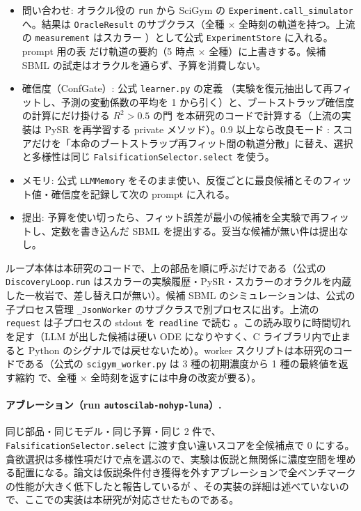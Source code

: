 \documentclass{article}
\begin{document}
\begin{itemize}
\item 問い合わせ: オラクル役の \texttt{run} から SciGym の \texttt{Experiment.call\_simulator} へ。結果は \texttt{OracleResult} のサブクラス（全種 × 全時刻の軌道を持つ。上流の \texttt{measurement} はスカラー \cite[s2.p34]{kabra-2026-llm}）として公式 \texttt{ExperimentStore} に入れる。prompt 用の表 \cite[s2.p33]{kabra-2026-llm} だけ軌道の要約（5 時点 × 全種）に上書きする。候補 SBML の試走はオラクルを通らず、予算を消費しない。
\item 確信度（ConfGate）: 公式 \texttt{learner.py} の定義 \cite[s2.p35]{kabra-2026-llm}（実験を復元抽出して再フィットし、予測の変動係数の平均を 1 から引く）と、ブートストラップ確信度の計算にだけ掛ける $R^2 > 0.5$ の門 \cite[s2.p36]{kabra-2026-llm} を本研究のコードで計算する（上流の実装は PySR を再学習する private メソッド）。0.9 以上なら改良モード \cite[s2.p12]{kabra-2026-llm}: スコアだけを「本命のブートストラップ再フィット間の軌道分散」に替え、選択と多様性は同じ \texttt{FalsificationSelector.select} を使う。
\item メモリ: 公式 \texttt{LLMMemory} をそのまま使い、反復ごとに最良候補とそのフィット値・確信度を記録して次の prompt に入れる。
\item 提出: 予算を使い切ったら、フィット誤差が最小の候補を全実験で再フィットし、定数を書き込んだ SBML を提出する。妥当な候補が無い件は提出なし。
\end{itemize}
ループ本体は本研究のコードで、上の部品を順に呼ぶだけである（公式の \texttt{DiscoveryLoop.run} はスカラーの実験履歴・PySR・スカラーのオラクルを内蔵した一枚岩で、差し替え口が無い）。候補 SBML のシミュレーションは、公式の子プロセス管理 \texttt{\_JsonWorker} のサブクラスで別プロセスに出す。上流の \texttt{request} は子プロセスの stdout を \texttt{readline} で読む \cite[s2.p32]{kabra-2026-llm}。この読み取りに時間切れを足す（LLM が出した候補は硬い ODE になりやすく、C ライブラリ内で止まると Python のシグナルでは戻せないため）。worker スクリプトは本研究のコードである（公式の \texttt{scigym\_worker.py} は 3 種の初期濃度から 1 種の最終値を返す縮約 \cite[s2.p14]{kabra-2026-llm} で、全種 × 全時刻を返すには中身の改変が要る）。

\paragraph{アブレーション（run \texttt{autoscilab-nohyp-luna}）.}
同じ部品・同じモデル・同じ予算・同じ 2 件で、\texttt{FalsificationSelector.select} に渡す食い違いスコアを全候補点で 0 にする。貪欲選択は多様性項だけで点を選ぶので、実験は仮説と無関係に濃度空間を埋める配置になる。論文は仮説条件付き獲得を外すアブレーションで全ベンチマークの性能が大きく低下したと報告しているが \cite[s2.p7]{kabra-2026-llm}、その実装の詳細は述べていないので、ここでの実装は本研究が対応させたものである。
\end{document}
